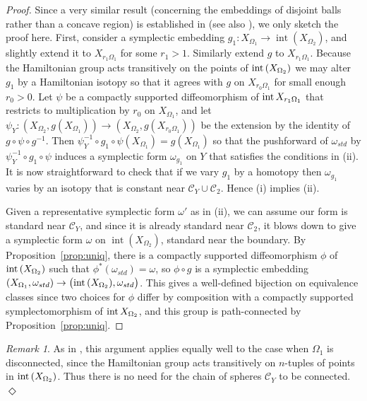 \documentclass[11pt, reqno]{amsart}
\theoremstyle{remark}
\numberwithin{equation}{subsection}
\numberwithin{figure}{section}
\theoremstyle{customremark}
\newtheorem{rmk_no_diamond}[thm]{Remark}
\newenvironment{rmk}{\begin{rmk_no_diamond} } {\hfill$\er$ \end{rmk_no_diamond}}
\newcommand{\intt}{{\rm int}}
\newcommand{\Cc}{{\mathcal C}}
\newcommand{\Om}{{\Omega}}
\newcommand{\om}{{\omega}}
\newcommand{\MS}{{\medskip}}
\newcommand{\er}{{\Diamond}}
\newcommand{\op}[1]{{\operatorname{#1}}}
\begin{document}
\begin{proof} Since a very similar result (concerning the embeddings of disjoint balls rather than a concave region) is established in \cite[\S2.1]{McPolt} (see also \cite[Thm.7.1.20]{INTRO}), we only sketch the proof here.
First, consider a symplectic embedding $g_1: X_{\Om_1}\to \op{int}(X_{\Omega_2})$, and slightly extend it to $X_{r_1\Om_1}$ for some $r_1>1$. Similarly extend $g$ to  $X_{r_1\Om_1}$. 
Because the Hamiltonian group acts transitively on the points of $\intt\, (X_{\Om_2})$ 
we may alter  $g_1$ by a Hamiltonian isotopy so that it agrees with
$g$ on 
$X_{r_0 \Omega_1}$ for small enough $r_0>0$.  Let $\psi$ be a  compactly supported diffeomorphism  of 
 $\intt\,  X_{r_1 \Omega_1}$ that restricts to multiplication by $r_0$ on  $X_{\Omega_1}$, and let
 $\psi_Y: (X_{\Om_2}, g(X_{\Om_1})) \to (X_{\Om_2}, g(X_{r_0\Om_1})) $ be the extension by the identity of $g\circ \psi \circ g^{-1}$.
 Then  $\psi_Y^{-1}\circ g_1\circ \psi (X_{\Om_1}) = g(X_{\Om_1})$  so that the pushforward of $\om_{std}$ by $\psi_Y^{-1}\circ g_1\circ \psi$ induces  a symplectic form $\om_{g_1}$ on $Y$ that satisfies the conditions in (ii). 
 It is now straightforward to check that if we vary $g_1$ by a homotopy then $\om_{g_1}$ varies by an isotopy that is constant near
 $\Cc_Y\cup \Cc_2$.  Hence (i) implies (ii).
 \MS
 
 Given a representative symplectic form $\om'$ as in (ii), we can assume our form is standard near $\Cc_{Y}$, and since it is already standard near $\Cc_2$, it blows down to give a symplectic form $\omega$ on $\op{int}(X_{\Omega_2})$, standard near the boundary.  By Proposition~\ref{prop:uniq}, there is a compactly supported diffeomorphism $\phi$ of $\intt\, (X_{\Om_2})$ such that $\phi^*(\om_{std}) = \om$, so $\phi \circ g$ is a symplectic embedding $(X_{\Om_1}, \om_{std}) \to \bigl(\intt\, (X_{\Om_2}), \om_{std}\bigr)$.  This gives a well-defined bijection on equivalence classes since  two choices for $\phi$ differ by composition with a compactly supported symplectomorphism of $\intt\,  X_{\Om_2}$,
 and this group is path-connected by Proposition~\ref{prop:uniq}.   
\end{proof}

\begin{rmk}\rm As in \cite{CG}, this argument applies equally well to the case when $\Om_1$ is disconnected, since the Hamiltonian group acts transitively on $n$-tuples of points in $\intt\, (X_{\Om_2})$. Thus there is 
no  need for the chain of spheres $\Cc_Y$ to be connected. 
\end{rmk}
\end{document}
